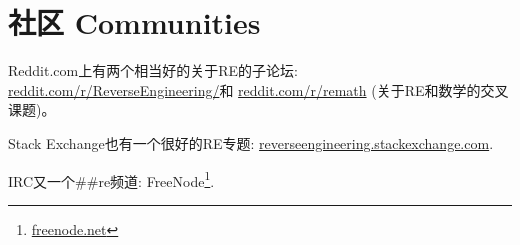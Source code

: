 \documentclass[UTF8,nofonts]{ctexart}
\begin{document}

\chapter{社区 Communities}

Reddit.com上有两个相当好的关于\ac{RE}的子论坛:
\href{http://go.yurichev.com/17027}{reddit.com/r/ReverseEngineering/}和
\href{http://go.yurichev.com/17028}{reddit.com/r/remath}
(关于\ac{RE}和数学的交叉课题)。

Stack Exchange也有一个很好的\ac{RE}专题:
\href{http://go.yurichev.com/17029}{reverseengineering.stackexchange.com}.

IRC又一个\#\#re频道:
FreeNode\footnote{\href{http://go.yurichev.com/17030}{freenode.net}}.
\end{document}
